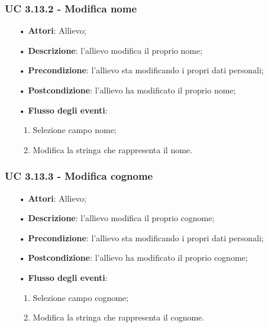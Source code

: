 \subsubsection{UC 3.13.2 - Modifica nome}
\begin{itemize}
	\item[•]\textbf{Attori}: Allievo;
	\item[•]\textbf{Descrizione}: l'allievo modifica il proprio nome;
	\item[•]\textbf{Precondizione}: l'allievo sta modificando i propri dati personali;
	\item[•]\textbf{Postcondizione}: l'allievo ha modificato il proprio nome; 
	\item[•]\textbf{Flusso degli eventi}: 
	\begin{enumerate}
		\item Selezione campo nome;
		\item Modifica la stringa che rappresenta il nome.
	\end{enumerate}
\end{itemize}
\subsubsection{UC 3.13.3 - Modifica cognome}
\begin{itemize}
	\item[•]\textbf{Attori}: Allievo;
	\item[•]\textbf{Descrizione}: l'allievo modifica il proprio cognome;
	\item[•]\textbf{Precondizione}: l'allievo sta modificando i propri dati personali;
	\item[•]\textbf{Postcondizione}: l'allievo ha modificato il proprio cognome; 
	\item[•]\textbf{Flusso degli eventi}: 
	\begin{enumerate}
		\item Selezione campo cognome;
		\item Modifica la stringa che rappresenta il cognome.
	\end{enumerate}
\end{itemize}
